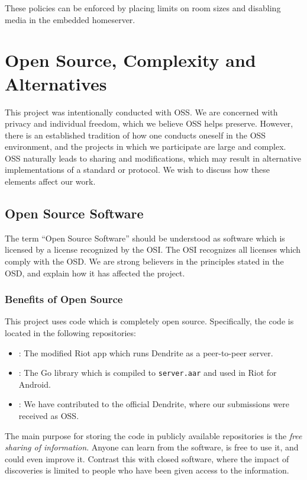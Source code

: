 These policies can be enforced by placing limits on room sizes and disabling media in the embedded homeserver.


\chapter{Open Source, Complexity and Alternatives}\label{chp:open_source_complexity_alternatives}
This project was intentionally conducted with \ac{OSS}.
We are concerned with privacy and individual freedom, which we believe \ac{OSS} helps preserve.
However, there is an established tradition of how one conducts oneself in the \ac{OSS} environment, and the projects in which we participate are large and complex.
\ac{OSS} naturally leads to sharing and modifications, which may result in alternative implementations of a standard or protocol.
We wish to discuss how these elements affect our work.

\section{Open Source Software}\label{sec:open_source}
The term ``Open Source Software'' should be understood as software which is licensed by a license recognized by the \ac{OSI}\cite{open_source_initiative}.
The \ac{OSI} recognizes all licenses which comply with the \ac{OSD}\cite{open_source_definition}.
We are strong believers in the principles stated in the \ac{OSD}, and explain how it has affected the project.

\subsection{Benefits of Open Source}\label{subsec:benefits_of_open_source}
This project uses code which is completely open source.
Specifically, the code is located in the following repositories:
\begin{itemize}
	\item{
		:
		The modified Riot app which runs Dendrite as a peer-to-peer server.
	}
	\item{
		:
		The Go library which is compiled to \texttt{server.aar} and used in Riot for Android.
	}
	\item{
		:
		We have contributed to the official Dendrite, where our submissions were received as \ac{OSS}.
	}
\end{itemize}

The main purpose for storing the code in publicly available repositories is the \textit{free sharing of information}.
Anyone can learn from the software, is free to use it, and could even improve it.
Contrast this with closed software, where the impact of discoveries is limited to people who have been given access to the information.

